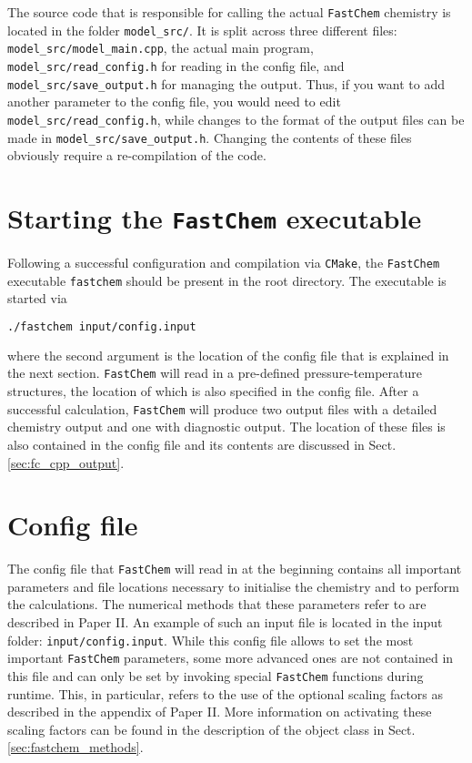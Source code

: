 \documentclass[numbers=noenddot]{aux/fcmanual}
\newcommand{\fc}{\texttt{FastChem}\xspace}
\begin{document}
The source code that is responsible for calling the actual \fc chemistry is located in the folder \verb|model_src/|. It is split across three different files: \verb|model_src/model_main.cpp|, the actual main program, \verb|model_src/read_config.h| for reading in the config file, and \verb|model_src/save_output.h| for managing the output. Thus, if you want to add another parameter to the config file, you would need to edit \verb|model_src/read_config.h|, while changes to the format of the output files can be made in \verb|model_src/save_output.h|. Changing the contents of these files obviously require a re-compilation of the code.


\section{Starting the \fc executable}

Following a successful configuration and compilation via \verb|CMake|, the \fc executable \verb|fastchem| should be present in the root directory. The executable is started via
\begin{lstlisting}[language=bash]
  ./fastchem input/config.input
\end{lstlisting}
where the second argument is the location of the config file that is explained in the next section. \fc will read in a pre-defined pressure-temperature structures, the location of which is also specified in the config file. After a successful calculation, \fc will produce two output files with a detailed chemistry output and one with diagnostic output. The location of these files is also contained in the config file and its contents are discussed in Sect. \ref{sec:fc_cpp_output}.


\section{Config file}

The config file that \fc will read in at the beginning contains all important parameters and file locations necessary to initialise the chemistry and to perform the calculations. The numerical methods that these parameters refer to are described in Paper II.
An example of such an input file is located in the input folder: \verb|input/config.input|. While this config file allows to set the most important \fc parameters, some more advanced ones are not contained in this file and can only be set by invoking special \fc functions during runtime. This, in particular, refers to the use of the optional scaling factors as described in the appendix of Paper II. More information on activating these scaling factors can be found in the description of the object class in Sect. \ref{sec:fastchem_methods}.\\
\end{document}
